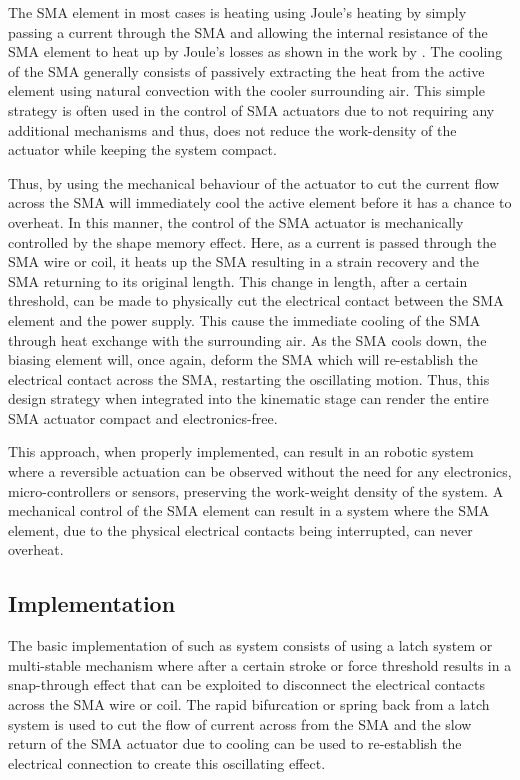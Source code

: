 The SMA element in most cases is heating using Joule's heating by simply passing a current through the SMA and allowing the internal resistance of the SMA element to heat up by Joule's losses as shown in the work by \todocite. The cooling of the SMA generally consists of passively extracting the heat from the active element using natural convection with the cooler surrounding air. This simple strategy is often used in the control of SMA actuators due to not requiring any additional mechanisms and thus, does not reduce the work-density of the actuator while keeping the system compact.

Thus, by using the mechanical behaviour of the actuator to cut the current flow across the SMA will immediately cool the active element before it has a chance to overheat. In this manner, the control of the SMA actuator is mechanically controlled by the shape memory effect. Here, as a current is passed through the SMA wire or coil, it heats up the SMA resulting in a strain recovery and the SMA returning to its original length. This change in length, after a certain threshold, can be made to physically cut the electrical contact between the SMA element and the power supply. This cause the immediate cooling of the SMA through heat exchange with the surrounding air. As the SMA cools down, the biasing element will, once again, deform the SMA which will re-establish the electrical contact across the SMA, restarting the oscillating motion. Thus, this design strategy when integrated into the kinematic stage can render the entire SMA actuator compact and electronics-free.

This approach, when properly implemented, can result in an robotic system where a reversible actuation can be observed without the need for any electronics, micro-controllers or sensors, preserving the work-weight density of the system. A mechanical control of the SMA element can result in a system where the SMA element, due to the physical electrical contacts being interrupted, can never overheat.

\subsection{Implementation}\label{sec:magnetic-latch}
The basic implementation of such as system consists of using a latch system or multi-stable mechanism where after a certain stroke or force threshold results in a snap-through effect that can be exploited to disconnect the electrical contacts across the SMA wire or coil. The rapid bifurcation or spring back from a latch system is used to cut the flow of current across from the SMA and the slow return of the SMA actuator due to cooling can be used to re-establish the electrical connection to create this oscillating effect.

